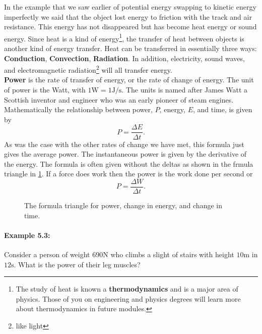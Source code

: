 In the example that we saw earlier of potential energy swapping to kinetic energy imperfectly we said that the object lost energy to friction with the track and air resistance. This energy has not disappeared but has become heat energy or sound energy.  Since heat is a kind of energy\footnote{The study of heat is known a \textbf{thermodynamics} and is a major area of physics. Those of you on engineering and physics degrees will learn more about thermodynamics in future modules.}, the transfer of heat between objects is another kind of energy transfer. Heat can be transferred in essentially three ways: \textbf{Conduction}, \textbf{Convection}, \textbf{Radiation}. In addition, electricity, sound waves, and electromagnetic radiation\footnote{like light} will all transfer energy.\\

\textbf{Power} is the rate of transfer of energy, or the rate of change of energy. The unit of power is the Watt, with $1\text{W}=1 \text{J}/\text{s}$. The units is named after James Watt a Scottish inventor and engineer who was an early pioneer of steam engines. Mathematically the relationship between power, $P$, energy, $E$, and time, is given by
\begin{equation}
P=\frac{\Delta E}{\Delta t}.
\label{eq: PET equation}
\end{equation}
As was the case with the other rates of change we have met, this formula just gives the average power. The instantaneous power is given by the derivative of the energy. The formula is often given without the deltas as shown in the frmula triangle in \cref{fig: PEt triangle}. If a force does work then the power is the work done per second or 
\begin{equation*}
P=\frac{\Delta W}{\Delta t}.
\end{equation*}

\begin{figure}[ht]
    \centering
    \large {}
    \caption{The formula triangle for power, change in energy, and change in time. }
    \label{fig: PEt triangle}
\end{figure}

\paragraph{Example 5.3:} Consider a person of weight $690\text{N}$ who climbs a slight of stairs with height $10\text{m}$ in $12\text{s}$.  What is the power of their leg muscles?\\

